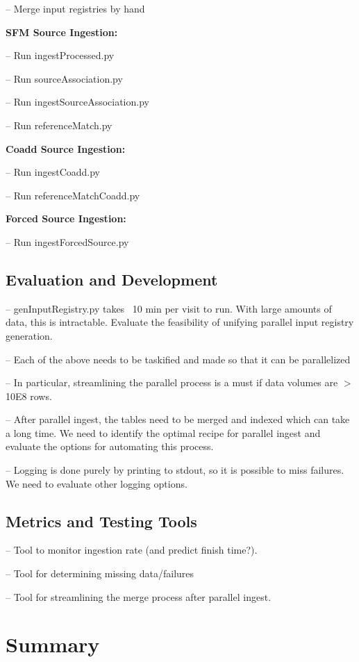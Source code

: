 \documentclass[12pt]{article}
\begin{document}
-- Merge input registries by hand

{\bf SFM Source Ingestion:}

-- Run ingestProcessed.py

-- Run sourceAssociation.py

-- Run ingestSourceAssociation.py

-- Run referenceMatch.py

{\bf Coadd Source Ingestion:}

-- Run ingestCoadd.py

-- Run referenceMatchCoadd.py

{\bf Forced Source Ingestion:}

-- Run ingestForcedSource.py

\subsection{Evaluation and Development}
-- genInputRegistry.py takes ~10 min per visit to run.  With large amounts of data, this is intractable.  Evaluate the feasibility of unifying parallel input registry generation.

-- Each of the above needs to be taskified and made so that it can be parallelized

-- In particular, streamlining the parallel process is a must if data volumes are $>$ 10E8 rows.

-- After parallel ingest, the tables need to be merged and indexed which can take a long time.  We need to identify the optimal recipe for parallel ingest and evaluate the options for automating this process.

-- Logging is done purely by printing to stdout, so it is possible to miss failures.  We need to evaluate other logging options.

\subsection{Metrics and Testing Tools}

-- Tool to monitor ingestion rate (and predict finish time?).

-- Tool for determining missing data/failures

-- Tool for streamlining the merge process after parallel ingest.


\section{Summary} 
\end{document}
